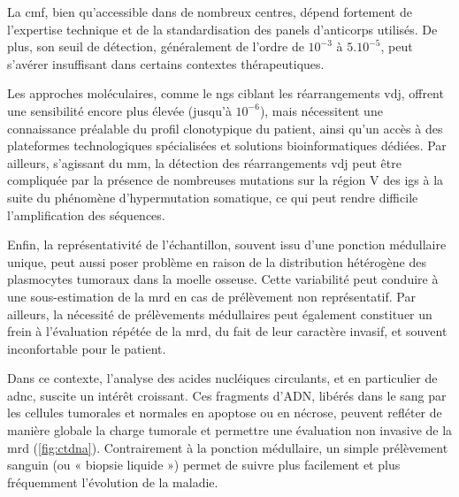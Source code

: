 \vspace{1em}

La \gls{cmf}, bien qu'accessible dans de nombreux centres, dépend fortement de l'expertise technique et de la standardisation
des panels d'anticorps utilisés. De plus, son seuil de détection, généralement de l'ordre de $10^{-3}$ à $5.10^{-5}$, peut s'avérer insuffisant dans certains contextes
thérapeutiques.

\vspace{1em}

Les approches moléculaires, comme le \gls{ngs} ciblant les réarrangements \gls{vdj}, offrent une sensibilité encore plus élevée (jusqu'à $10^{-6}$),
mais nécessitent une connaissance préalable du profil clonotypique du patient, ainsi qu'un accès à des plateformes technologiques spécialisées et solutions 
bioinformatiques dédiées. Par ailleurs, s'agissant du \gls{mm}, la détection des réarrangements \gls{vdj} peut être compliquée par la présence de nombreuses 
mutations sur la région V des \glspl{ig} à la suite du phénomène d'hypermutation somatique, ce qui peut rendre difficile l'amplification des séquences.

\vspace{1em}

Enfin, la représentativité de l'échantillon, souvent issu d'une ponction médullaire unique, peut aussi poser problème en raison de la distribution hétérogène
des plasmocytes tumoraux dans la moelle osseuse. Cette variabilité peut conduire à une sous-estimation de la \gls{mrd} en cas de prélèvement non représentatif.
Par ailleurs, la nécessité de prélèvements médullaires peut également constituer un frein à l'évaluation répétée de la \gls{mrd}, du fait de leur caractère
invasif, et souvent inconfortable pour le patient.

\vspace{1em}

Dans ce contexte, l'analyse des acides nucléiques circulants, et en particulier de \gls{adnc}, suscite un intérêt croissant. Ces fragments d'ADN, libérés dans le sang 
par les cellules tumorales et normales en apoptose ou en nécrose, peuvent refléter de manière globale la charge tumorale et permettre une évaluation non 
invasive de la \gls{mrd} (\autoref{fig:ctdna}). Contrairement à la ponction médullaire, un simple prélèvement sanguin (ou « biopsie liquide ») permet de suivre plus facilement 
et plus fréquemment l'évolution de la maladie.

\vspace{1em}

